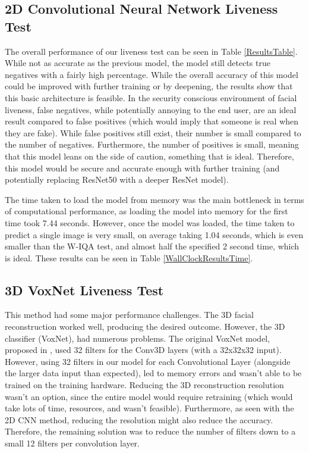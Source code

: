 \documentclass[11pt,a4paper]{article}
\begin{document}
    \subsection{2D Convolutional Neural Network Liveness Test}



        The overall performance of our liveness test can be seen in Table \ref{ResultsTable}. While not as accurate as the previous model, the model still detects true negatives with a fairly high percentage.
        While the overall accuracy of this model could be improved with further training or by deepening, the results show that this basic architecture is feasible. In the security conscious environment of facial liveness,
        false negatives, while potentially annoying to the end user, are an ideal result compared to false positives (which would imply that someone is real when they are fake). While false positives still exist, their number is small compared to the number of negatives.
        Furthermore, the number of positives is small, meaning that this model leans on the side of caution, something that is ideal. Therefore, this model would be secure and accurate enough with further training (and potentially replacing ResNet50 with a deeper ResNet model).

        The time taken to load the model from memory was the main bottleneck in terms of computational performance, as loading the model into memory for the first time took 7.44 seconds. However, once the model was loaded,
        the time taken to predict a single image is very small, on average taking 1.04 seconds, which is even smaller than the W-IQA test, and almost half the specified 2 second time, which is ideal. These results can be seen in Table \ref{WallClockResultsTime}.     

    
    \subsection{3D VoxNet Liveness Test}
        This method had some major performance challenges. The 3D facial reconstruction worked well, producing the desired outcome. However, the 3D classifier (VoxNet), had numerous problems.
        The original VoxNet model, proposed in \cite{VoxNetModel}, used 32 filters for the Conv3D layers (with a 32x32x32 input). However, using 32 filters in our model for each Convolutional Layer (alongside the larger data input than expected),
        led to memory errors and wasn't able to be trained on the training hardware.  Reducing the 3D reconstruction resolution wasn't an option, since the entire model would require retraining (which would take lots of time, resources, and wasn't feasible).
        Furthermore, as seen with the 2D CNN method, reducing the resolution might also reduce the accuracy. Therefore, the remaining solution was to reduce the number of filters down to a small 12 filters per convolution layer.
\end{document}
